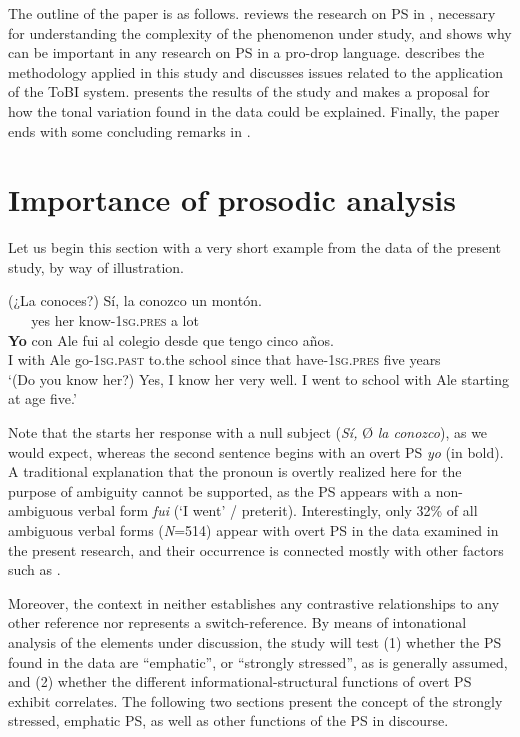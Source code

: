 \documentclass[output=paper]{langsci/langscibook}
\begin{document}
The outline of the paper is as follows.  reviews the research on PS in , necessary for understanding the complexity of the phenomenon under study, and shows why  can be important in any research on PS in a pro-drop language.  describes the methodology applied in this study and discusses issues related to the application of the ToBI system.  presents the results of the study and makes a proposal for how the tonal variation found in the data could be explained. Finally, the paper ends with some concluding remarks in . 

\section{Importance of prosodic analysis}
\label{sec:pes:2}
Let us begin this section with a very short example  from the data of the present study, by way of illustration.


\ea \label{ex:pes:1}
\gll  (¿La conoces?)   Sí,  la  conozco     un montón.\\
      ~ ~     yes  her   know-\textsc{1sg}.\textsc{pres}  a lot\\
     
\gll \textbf{Yo} con Ale   fui     al colegio  desde que tengo     cinco a{\~n}os. \\
     I with Ale    go-\textsc{1sg}.\textsc{past}   to.the school  since that have-\textsc{1sg}.\textsc{pres} five years\\
\glt ‘(Do you know her?) Yes, I know her very well. I went to school with Ale starting at age five.’
\z

Note that the  starts her response with a null subject (\textit{Sí,} Ø \textit{la conozco}), as we would expect, whereas the second sentence begins with an overt PS \textit{yo} (in bold). A traditional explanation that the pronoun is overtly realized here for the purpose of ambiguity cannot be supported, as the PS appears with a non-ambiguous verbal form \textit{fui} (‘I went’ / preterit). Interestingly, only 32\% of all ambiguous verbal forms (\textit{N}=514) appear with overt PS in the data examined in the present research, and their occurrence is connected mostly with other factors such as .

Moreover, the context in  neither establishes any contrastive relationships to any other reference nor represents a switch-reference. By means of intonational analysis of the elements under discussion, the study will test 
(1) whether the PS found in the data are ``emphatic'', or ``strongly stressed'', as is generally assumed, and
(2) whether the different informational-structural functions of overt PS exhibit  correlates. The following two sections present the concept of the strongly stressed, emphatic PS, as well as other functions of the PS in discourse.
  
\end{document}
